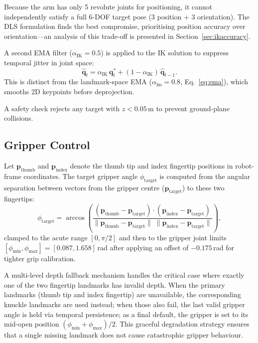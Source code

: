 \documentclass{ieeeaccess}
\newcommand{\vect}[1]{\mathbf{#1}}
\begin{document}
Because the arm has only 5 revolute joints for positioning, it cannot
independently satisfy a full 6-DOF target pose (3 position +
3 orientation). The DLS formulation finds the best compromise,
prioritising position accuracy over orientation---an analysis of this
trade-off is presented in Section~\ref{sec:ikaccuracy}.

A second EMA filter ($\alpha_{\text{IK}} = 0.5$) is applied to the IK
solution to suppress temporal jitter in joint space:
\begin{equation}
  \hat{\vect{q}}_t = \alpha_{\text{IK}}\,\vect{q}^*_t
                        + (1 - \alpha_{\text{IK}})\,\hat{\vect{q}}_{t-1}.
\end{equation}
This is distinct from the landmark-space EMA
($\alpha_{\text{lm}} = 0.8$, Eq.~\ref{eq:ema}), which smooths 2D
keypoints before deprojection.

A safety check rejects any target with $z < 0.05$\,m to prevent
ground-plane collisions.

\subsection{Gripper Control}
\label{sec:gripper}

Let $\vect{p}_{\text{thumb}}$ and $\vect{p}_{\text{index}}$ denote
the thumb tip and index fingertip positions in robot-frame coordinates.
The target gripper angle $\phi_{\text{target}}$ is computed from the
angular separation between vectors from the gripper centre
($\vect{p}_{\text{target}}$) to these two fingertips:
\begin{equation}\label{eq:gripper}
  \phi_{\text{target}} = \arccos\!\left(
    \frac{(\vect{p}_{\text{thumb}} - \vect{p}_{\text{target}})
          \cdot
          (\vect{p}_{\text{index}} - \vect{p}_{\text{target}})}
         {\|\vect{p}_{\text{thumb}} - \vect{p}_{\text{target}}\|\;
          \|\vect{p}_{\text{index}} - \vect{p}_{\text{target}}\|}
  \right),
\end{equation}
clamped to the acute range $[0, \pi/2]$ and then to the gripper joint
limits $[\phi_{\min}, \phi_{\max}] = [0.087, 1.658]$\,rad after
applying an offset of $-0.175$\,rad for tighter grip calibration.

A multi-level depth fallback mechanism handles the critical case where
exactly one of the two fingertip landmarks has invalid depth.
When the primary landmarks (thumb tip and index fingertip) are
unavailable, the corresponding knuckle landmarks are used instead;
when those also fail, the last valid gripper angle is held via temporal
persistence; as a final default, the gripper is set to its mid-open
position $(\phi_{\min}+\phi_{\max})/2$. This graceful degradation
strategy ensures that a single missing landmark does not cause
catastrophic gripper behaviour.
\end{document}
